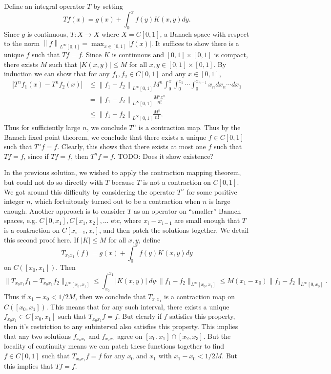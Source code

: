\documentclass[answers]{exam}
\theoremstyle{problemstyle}
\newcommand{\norm}[1]{\left\lVert#1\right\rVert} %
\newcommand{\1}[1]{\textbf{1}_{\left[#1\right]}} %
\begin{document}
\begin{questions}
  \begin{solution}
    Define an integral operator $T$ by setting
    \[ Tf(x) = g(x)+\int_{0}^{x}f(y)K(x,y)dy. \]
    Since $g$ is continuous, $T:X\to X$ where $X=C[0,1]$, a Banach space with respect to the norm $\norm{f}_{L^\infty[0,1]} = \max_{x\in[0,1]} |f(x)|$. It suffices to show there is a unique $f$ such that $Tf = f$. Since $K$ is continuous and $[0,1]\times[0,1]$ is compact, there exists $M$ such that $|K(x,y)|\leq M$ for all $x,y\in [0,1]\times[0,1]$.
    By induction we can show that for any $f_{1},f_{2}\in C[0,1]$ and any $x\in [0,1]$,
    \begin{align*}
      |T^{n}f_{1}(x)-T^{n}f_{2}(x)|
      &\leq \norm{f_{1}-f_{2}}_{L^\infty[0,1]} M^{n}\int_{0}^{x}\int_{0}^{x_{1}}\cdots \int_{0}^{x_{n-1}}x_{n}dx_{n}\cdots dx_{1}\\
      &=\norm{f_{1}-f_{2}}_{L^\infty[0,1]} \frac{M^n x^{n}}{n! }\\
      &\leq \norm{f_{1}-f_{2}}_{L^\infty[0,1]} \frac{M^{n}}{n!}.
    \end{align*}
    Thus for sufficiently large $n$, we conclude $T^n$ is a contraction map. Thus by the Banach fixed point theorem, we conclude that there exists a unique $f \in C[0,1]$ such that $T^n f = f$. Clearly, this shows that there exists at most one $f$ such that $Tf = f$, since if $Tf = f$, then $T^n f = f$. TODO: Does it show existence?

    In the previous solution, we wished to apply the contraction mapping theorem, but could not do so directly with $T$ because $T$ is not a contraction on $C[0,1]$. We got around this difficulty by considering the operator $T^n$ for some positive integer $n$, which fortuitously turned out to be a contraction when $n$ is large enough. Another approach is to consider $T$ as an operator on ``smaller'' Banach spaces, e.g. $C[0,x_1], C[x_1,x_2], \ldots$ etc, where $x_i-x_{i-1}$ are small enough that $T$ is a contraction on $C[x_{i-1},x_{i}]$, and then patch the solutions together. We detail this second proof here. If $|K|\leq M$ for all $x,y$, define
    \[ T_{x_0 x_1}(f)= g(x)+\int_{0}^{x}f(y)K(x,y)dy \]
    on $C([x_0,x_1])$. Then
    \[ \| T_{x_0 x_1} f_1 - T_{x_0 x_1} f_2 \|_{L^\infty[x_0,x_1]} \leq \int_{x_0}^{x_1} |K(x,y)|\; dy \cdot \| f_1 - f_2 \|_{L^\infty[x_0,x_1]} \leq M(x_1 - x_0) \| f_1 - f_2 \|_{L^\infty[0,x_0]}. \]
    Thus if $x_1 - x_0 < 1/2M$, then we conclude that $T_{x_0 x_1}$ is a contraction map on $C([x_0,x_1])$. This means that for any such interval, there exists a unique $f_{x_0x_1} \in C[x_0,x_1]$ such that $T_{x_0 x_1} f = f$. But clearly if $f$ satisfies this property, then it's restriction to any subinterval also satisfies this property. This implies that any two solutions $f_{x_0x_1}$ and $f_{x_2x_3}$ agree on $[x_0,x_1] \cap [x_2,x_3]$. But the locality of continuity means we can patch these functions together to find $f \in C[0,1]$ such that $T_{x_0x_1} f = f$ for any $x_0$ and $x_1$ with $x_1 - x_0 < 1/2M$. But this implies that $Tf = f$.
\end{solution}


\end{questions}
\end{document}
